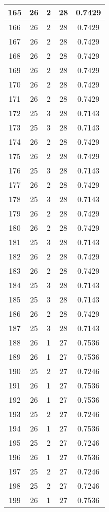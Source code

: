 \documentclass[letterpaper, 12pt]{article}
\begin{document}
\begin{longtable}{|c|c|c|c|c|}
\hline
165 & 26 & 2 & 28 & 0.7429 \\
\hline
166 & 26 & 2 & 28 & 0.7429 \\
\hline
167 & 26 & 2 & 28 & 0.7429 \\
\hline
168 & 26 & 2 & 28 & 0.7429 \\
\hline
169 & 26 & 2 & 28 & 0.7429 \\
\hline
170 & 26 & 2 & 28 & 0.7429 \\
\hline
171 & 26 & 2 & 28 & 0.7429 \\
\hline
172 & 25 & 3 & 28 & 0.7143 \\
\hline
173 & 25 & 3 & 28 & 0.7143 \\
\hline
174 & 26 & 2 & 28 & 0.7429 \\
\hline
175 & 26 & 2 & 28 & 0.7429 \\
\hline
176 & 25 & 3 & 28 & 0.7143 \\
\hline
177 & 26 & 2 & 28 & 0.7429 \\
\hline
178 & 25 & 3 & 28 & 0.7143 \\
\hline
179 & 26 & 2 & 28 & 0.7429 \\
\hline
180 & 26 & 2 & 28 & 0.7429 \\
\hline
181 & 25 & 3 & 28 & 0.7143 \\
\hline
182 & 26 & 2 & 28 & 0.7429 \\
\hline
183 & 26 & 2 & 28 & 0.7429 \\
\hline
184 & 25 & 3 & 28 & 0.7143 \\
\hline
185 & 25 & 3 & 28 & 0.7143 \\
\hline
186 & 26 & 2 & 28 & 0.7429 \\
\hline
187 & 25 & 3 & 28 & 0.7143 \\
\hline
188 & 26 & 1 & 27 & 0.7536 \\
\hline
189 & 26 & 1 & 27 & 0.7536 \\
\hline
190 & 25 & 2 & 27 & 0.7246 \\
\hline
191 & 26 & 1 & 27 & 0.7536 \\
\hline
192 & 26 & 1 & 27 & 0.7536 \\
\hline
193 & 25 & 2 & 27 & 0.7246 \\
\hline
194 & 26 & 1 & 27 & 0.7536 \\
\hline
195 & 25 & 2 & 27 & 0.7246 \\
\hline
196 & 26 & 1 & 27 & 0.7536 \\
\hline
197 & 25 & 2 & 27 & 0.7246 \\
\hline
198 & 25 & 2 & 27 & 0.7246 \\
\hline
199 & 26 & 1 & 27 & 0.7536 \\
\hline
\end{longtable}
\end{document}

